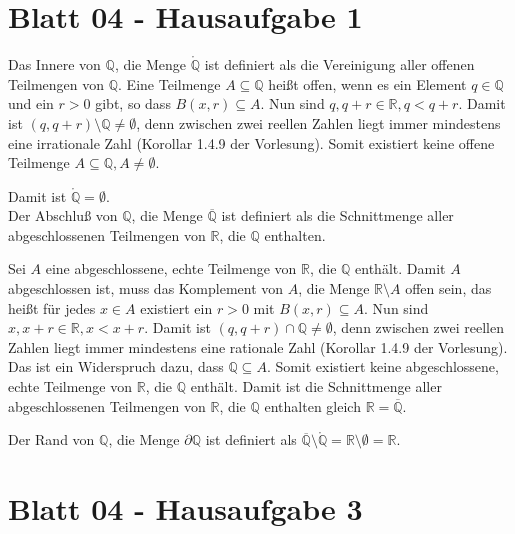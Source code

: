\documentclass{scrreprt}
\begin{document}
\section{Blatt 04 - Hausaufgabe 1}

Das Innere von $\mathbb{Q}$, die Menge $\mathring{\mathbb{Q}}$ ist definiert als die Vereinigung aller
offenen Teilmengen von $\mathbb{Q}$.
Eine Teilmenge $A \subseteq \mathbb{Q}$ heißt offen, wenn es ein Element $q \in \mathbb{Q}$
und ein $r > 0$ gibt, so dass $B(x, r) \subseteq A$.
Nun sind $q, q + r \in \mathbb{R}, q < q + r$.
Damit ist $(q, q + r) \setminus \mathbb{Q} \ne \emptyset$, denn zwischen zwei reellen Zahlen liegt
immer mindestens eine irrationale Zahl (Korollar 1.4.9 der Vorlesung).
Somit existiert keine offene Teilmenge $A \subseteq \mathbb{Q}, A \ne \emptyset$.

Damit ist $\mathring{\mathbb{Q}} = \emptyset$. \\

Der Abschluß von $\mathbb{Q}$, die Menge $\overline{\mathbb{Q}}$ ist definiert als
die Schnittmenge aller abgeschlossenen Teilmengen von $\mathbb{R}$, die $\mathbb{Q}$
enthalten.

Sei $A$ eine abgeschlossene, echte Teilmenge von $\mathbb{R}$, die $\mathbb{Q}$ enthält.
Damit $A$ abgeschlossen ist, muss das Komplement von $A$, die Menge $\mathbb{R} \setminus A$
offen sein, das heißt für jedes $x \in A$ existiert ein $r > 0$ mit $B(x, r) \subseteq A$.
Nun sind $x, x + r \in \mathbb{R}, x < x + r$.
Damit ist $(q, q + r) \cap \mathbb{Q} \ne \emptyset$, denn zwischen zwei reellen Zahlen liegt
immer mindestens eine rationale Zahl (Korollar 1.4.9 der Vorlesung).
Das ist ein Widerspruch dazu, dass $\mathbb{Q} \subseteq A$.
Somit existiert keine abgeschlossene, echte Teilmenge von $\mathbb{R}$, die $\mathbb{Q}$ enthält.
Damit ist die Schnittmenge aller abgeschlossenen Teilmengen von $\mathbb{R}$, die $\mathbb{Q}$
enthalten gleich $\mathbb{R} = \overline{\mathbb{Q}}$.

Der Rand von $\mathbb{Q}$, die Menge $\partial \mathbb{Q}$ ist definiert als
$\overline{\mathbb{Q}} \setminus \mathring{\mathbb{Q}} = \mathbb{R} \setminus \emptyset = \mathbb{R}$.

\section{Blatt 04 - Hausaufgabe 3}
\end{document}
